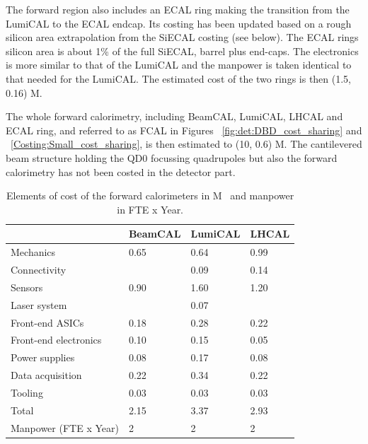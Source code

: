 
The forward region also includes an ECAL ring making the transition from the LumiCAL to the ECAL endcap. Its costing has been updated based on a rough silicon area extrapolation from the SiECAL costing (see below). The ECAL rings silicon area is about  1\% of the full SiECAL, barrel plus end-caps. The electronics is more similar to that of the LumiCAL and the manpower is taken identical to that needed for the LumiCAL.  The estimated cost of the two rings is then (1.5, 0.16) M\texteuro.  

The whole forward calorimetry, including BeamCAL, LumiCAL, LHCAL and ECAL ring, and referred to as FCAL in Figures ~\ref{fig:det:DBD_cost_sharing} and ~\ref{Costing:Small_cost_sharing}, is then estimated to (10, 0.6) M\texteuro. The cantilevered beam structure holding the QD0 focussing quadrupoles but also the forward calorimetry has not been costed in the detector part.


 \begin{table}\hspace*{-0cm}\small 
\begin{tabular}[h!]{ l p{0.2\hsize}p{0.2\hsize}p{0.2\hsize} }
\toprule
& BeamCAL & LumiCAL & LHCAL \\
\midrule
Mechanics              & 0.65   & 0.64   & 0.99   \\
Connectivity           &        & 0.09   & 0.14   \\
Sensors                & 0.90   & 1.60   & 1.20  \\
Laser system           &        & 0.07   &       \\
Front-end ASICs        & 0.18   & 0.28   & 0.22   \\
Front-end electronics  & 0.10   & 0.15   & 0.05  \\
Power supplies         & 0.08   & 0.17   & 0.08    \\
Data acquisition       & 0.22   & 0.34   & 0.22  \\
Tooling                & 0.03   & 0.03   & 0.03   \\
\midrule
Total                  & 2.15  & 3.37   & 2.93  \\
\midrule
Manpower (FTE x Year)  &2       &2       & 2 \\
\bottomrule
\end{tabular}
\caption{\label{FCals_summary}Elements of cost of the forward calorimeters in M\texteuro~ and manpower in FTE x Year.}
\end{table}

